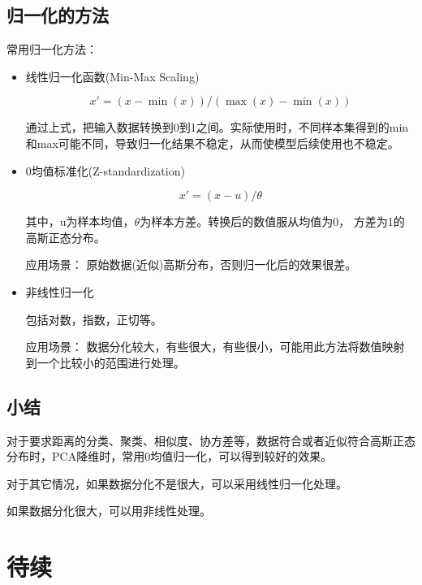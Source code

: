 \subsection{归一化的方法}

常用归一化方法：

\begin{itemize}
\item 线性归一化函数(Min-Max Scaling)

\begin{displaymath}
x' = (x - \min(x)) / (\max(x) - \min(x))
\end{displaymath}

通过上式，把输入数据转换到0到1之间。实际使用时，不同样本集得到的min和max可能不同，导致归一化结果不稳定，从而使模型后续使用也不稳定。

\item 0均值标准化(Z-standardization)

\begin{displaymath}
x' = (x - u)/\theta
\end{displaymath}

其中，u为样本均值，$\theta$为样本方差。转换后的数值服从均值为0， 方差为1的高斯正态分布。

应用场景： 原始数据(近似)高斯分布，否则归一化后的效果很差。

\item 非线性归一化

包括对数，指数，正切等。

应用场景： 数据分化较大，有些很大，有些很小，可能用此方法将数值映射到一个比较小的范围进行处理。

\end{itemize}

\subsection{小结}

对于要求距离的分类、聚类、相似度、协方差等，数据符合或者近似符合高斯正态分布时，PCA降维时，常用0均值归一化，可以得到较好的效果。

对于其它情况，如果数据分化不是很大，可以采用线性归一化处理。

如果数据分化很大，可以用非线性处理。

\section{待续}














